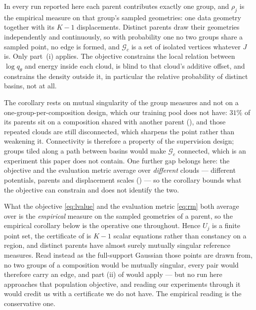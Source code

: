 \begin{corollary}
\label{cor:basins}
In every run reported here each parent contributes exactly one group, and $\rho_j$ is the empirical
measure on that group's sampled geometries: one data geometry together with its $K-1$
displacements. Distinct parents draw their geometries independently and continuously, so with
probability one no two groups share a sampled point, no edge is formed, and $\mathcal{G}_c$ is a
set of isolated vertices whatever $J$ is. Only part~(i) applies. The objective constrains the local
relation between $\log q_\theta$ and energy inside each cloud, is blind to that cloud's additive
offset, and constrains the density outside it, in particular the relative probability of
distinct basins, not at all.
\end{corollary}

The corollary rests on mutual singularity of the group measures and not on a
one-group-per-composition design, which our training pool does not have: $31\%$ of
its parents sit on a composition shared with another parent (), and
those repeated clouds are still disconnected, which sharpens the point rather than
weakening it. Connectivity is therefore a property of the supervision design;
groups tiled along a path between basins would make $\mathcal{G}_c$ connected, which
is an experiment this paper does not contain. One further gap belongs here: the
objective and the evaluation metric average over \emph{different} clouds --- different
potentials, parents and displacement scales
() --- so the corollary bounds what the objective can constrain and
does not identify the two.

\begin{remark}
\label{rem:refmeasure}
What the objective \eqref{eq:lvalue} and the evaluation metric \eqref{eq:rm} both
average over is the \emph{empirical} measure on the sampled geometries of a
parent, so the empirical corollary below is the operative one throughout. Hence
$U_j$ is a finite point set, the certificate of  is $K-1$
scalar equations rather than constancy on a region, and distinct parents have
almost surely mutually singular reference measures. Read instead as the full-support
Gaussian those points are drawn from, no two groups of a composition would be
mutually singular, every pair would therefore carry an edge, and part (ii) of
 would apply --- but no run here approaches that population objective,
and reading our experiments through it would credit us with a certificate we do not
have. The empirical reading is the conservative one.
\end{remark}

